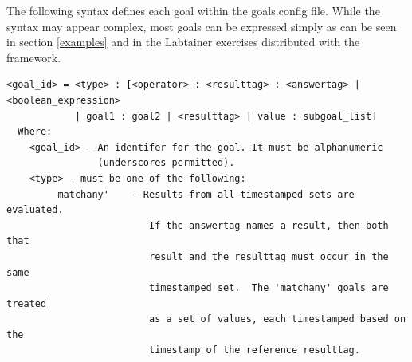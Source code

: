 \documentclass[12pt]{article}
\begin{document}
The following syntax defines each goal within the goals.config file.  While the syntax
may appear complex, most goals can be expressed simply as can be seen in section \ref{examples} and
in the Labtainer exercises distributed with the framework.

\begin{verbatim}
<goal_id> = <type> : [<operator> : <resulttag> : <answertag> | <boolean_expression> 
            | goal1 : goal2 | <resulttag> | value : subgoal_list]
  Where: 
    <goal_id> - An identifer for the goal. It must be alphanumeric 
                (underscores permitted).
    <type> - must be one of the following:
         matchany'    - Results from all timestamped sets are evaluated.
                         If the answertag names a result, then both that 
                         result and the resulttag must occur in the same 
                         timestamped set.  The 'matchany' goals are treated 
                         as a set of values, each timestamped based on the 
                         timestamp of the reference resulttag.
                      

\end{verbatim}
\end{document}
